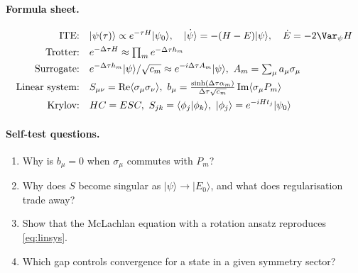 \documentclass[11pt,a4paper]{article}
\newcommand{\ket}[1]{\lvert #1\rangle}
\newcommand{\braket}[2]{\langle #1\vert #2\rangle}
\newcommand{\expect}[1]{\langle #1\rangle}
\begin{document}

\paragraph{Formula sheet.}
\begin{align*}
  \text{ITE:}\quad & \ket{\psi(\tau)}\propto e^{-\tau H}\ket{\psi_0}, \quad \dot{\ket\psi}=-(H-E)\ket\psi,\quad \dot E=-2\Var_\psi H\\
  \text{Trotter:}\quad & e^{-\Delta\tau H}\approx\textstyle\prod_m e^{-\Delta\tau h_m}\\
  \text{Surrogate:}\quad & e^{-\Delta\tau h_m}\ket\psi/\sqrt{c_m}\approx e^{-i\Delta\tau A_m}\ket\psi,\ A_m=\textstyle\sum_\mu a_\mu\sigma_\mu\\
  \text{Linear system:}\quad & S_{\mu\nu}=\operatorname{Re}\expect{\sigma_\mu\sigma_\nu},\ b_\mu=\tfrac{\sinh(\Delta\tau\alpha_m)}{\Delta\tau\sqrt{c_m}}\operatorname{Im}\expect{\sigma_\mu P_m}\\
  \text{Krylov:}\quad & HC=ESC,\ S_{jk}=\braket{\phi_j}{\phi_k},\ \ket{\phi_j}=e^{-iHt_j}\ket{\psi_0}
\end{align*}

\paragraph{Self-test questions.}
\begin{enumerate}
\item Why is $b_\mu=0$ when $\sigma_\mu$ commutes with $P_m$?
\item Why does $S$ become singular as $\ket\psi\to\ket{E_0}$, and what does regularisation trade away?
\item Show that the McLachlan equation with a rotation ansatz reproduces \cref{eq:linsys}.
\item Which gap controls convergence for a state in a given symmetry sector?
\end{enumerate}
\end{document}
